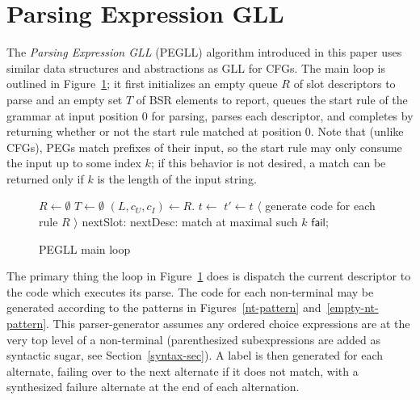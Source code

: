 \documentclass{article}
\newcommand{\fail}{\mathsf{fail}}
\begin{document}
\section{Parsing Expression GLL}
The \emph{Parsing Expression GLL} (PEGLL) algorithm introduced in this paper uses similar data structures and abstractions as GLL for CFGs. 
The main loop is outlined in Figure~\ref{main-loop-algo}; it first initializes an empty queue $R$ of slot descriptors to parse and an empty set $T$ of BSR elements to report, queues the start rule of the grammar at input position 0 for parsing, parses each descriptor, and completes by returning whether or not the start rule matched at position 0. 
Note that (unlike CFGs), PEGs match prefixes of their input, so the start rule may only consume the input up to some index $k$; if this behavior is not desired, a match can be returned only if $k$ is the length of the input string.

\begin{figure}
\caption{PEGLL main loop} \label{main-loop-algo}
\begin{algorithmic}
\State $R \gets \emptyset$ $T \gets \emptyset$
\State {}
    \State $(L, c_U, c_I) \gets R$.
    \State $t \gets$  $t' \gets t$
    \Loop
            \State $\langle$ generate code for each rule $R$ $\rangle$
        \EndSwitch
    \State nextSlot: \EndLoop
\State nextDesc: \EndWhile
{}
    \State \Return match at maximal such $k$
\Else
    \State \Return $\fail$;
\EndIf
\end{algorithmic}
\end{figure}

The primary thing the loop in Figure~\ref{main-loop-algo} does is dispatch the current descriptor to the code which executes its parse. 
The code for each non-terminal may be generated according to the patterns in Figures~\ref{nt-pattern} and~\ref{empty-nt-pattern}. 
This parser-generator assumes any ordered choice expressions are at the very top level of a non-terminal (parenthesized subexpressions are added as syntactic sugar, see Section~\ref{syntax-sec}). 
A label is then generated for each alternate, failing over to the next alternate if it does not match, with a synthesized failure alternate at the end of each alternation.
\end{document}
